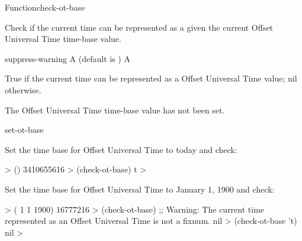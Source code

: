 \documentclass[10pt,twoside,english,pdftex]{article}
\begin{document}
\begin{functiondoc}{Function}{check-ot-base}{%
    }

%

\fnsyntax

\fnpurpose Check if the current time can be represented as a
 given the current Offset Universal Time time-base
value.

\fnpackage {}

\fnmodule {}

\fnargs
\begin{args}{suppress-warning}
 A  (default is \nil)
\arg[boolean] A 
\end{args}

\fnreturns True if the current time can be represented as a
 Offset Universal Time value; nil otherwise.

\fnerrors The Offset Universal Time time-base value has not been set.

\begin{alsos}{set-ot-base}
\also[*ot-base*]
\also[ot2ut]
\also[ut2ot]
\end{alsos}

\fnexamples
Set the time base for Offset Universal Time to today and check:
%
\W\supp
\begin{example}
  > ()
  3410655616
  > (check-ot-base)
  t
  >
\end{example}
%
Set the time base for Offset Universal Time to January 1, 1900 and check:
%
\W\supp\notpretop
\begin{example}
  > ( 1 1 1900)
  16777216
  > (check-ot-base)
  ;; Warning: The current time represented as an Offset Universal Time is not a fixnum.
  nil
  > (check-ot-base 't)
  nil
  >
\end{example}

\end{functiondoc}

\end{document}
